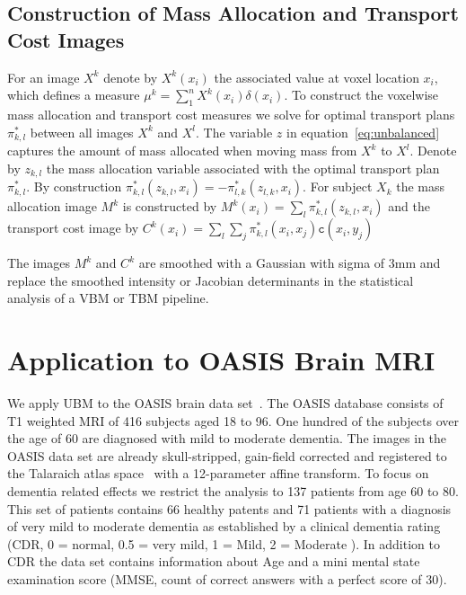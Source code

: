 \documentclass{llncs}
\newcommand{\cost}[0]{\mathtt{c}}
\newcommand{\coupling}[0]{\pi}
\begin{document}
\subsection{Construction of Mass Allocation and Transport Cost Images}
\label{sec:mass}
For an image $X^k$ denote by $X^k(x_i)$ the associated value at voxel location
$x_i$, which defines a measure $\mu^k = \sum_1^n X^k(x_i) \delta(x_i)$.
To construct the voxelwise mass allocation and transport cost measures we solve
for optimal transport plans $\coupling^*_{k,l}$ between all images $X^k$ and $X^l$.  
The variable $z$ in equation~\ref{eq:unbalanced} captures the amount of mass
allocated when moving mass from $X^k$ to $X^l$. Denote by $z_{k, l}$ the mass
allocation variable associated with the optimal transport plan
$\coupling^*_{k,l}$.  By construction $\coupling^*_{k,l}(z_{k,l}, x_i) =
-\coupling^*_{l,k}(z_{l,k}, x_i)$.  For
subject $X_k$ the mass allocation image $M^k$ is constructed by $M^k(x_i) =
\sum_l \coupling^*_{k,l}( z_{k, l}, x_i )$ and the transport cost image by
$C^k(x_i) = \sum_l \sum_j \coupling^*_{k,l}( x_i, x_j ) \cost(x_i, y_j)$

The images $M^k$ and $C^k$ are smoothed with a Gaussian with sigma of 3mm and
replace the smoothed intensity or Jacobian determinants in the statistical
analysis of a VBM or TBM pipeline. 


\section{Application to OASIS Brain MRI}
\label{sec:results}
We apply UBM to the OASIS brain data set~\cite{marcus2010open}. The OASIS
database consists of T1 weighted MRI of 416 subjects aged 18 to 96. One hundred
of the subjects over the age of 60 are diagnosed with mild to moderate
dementia. The images in the OASIS data set are already skull-stripped,
gain-field corrected and registered to the Talaraich atlas
space~\cite{talaraich:book88} with a 12-parameter affine transform.  To focus
on dementia related effects we restrict the analysis to 137 patients from age
60 to 80. This set of patients contains 66 healthy patents and 71 patients with
a diagnosis of very mild to moderate dementia as established by a clinical
dementia rating (CDR, 0 = normal, 0.5 = very mild, 1 = Mild, 2 = Moderate ). In
addition to CDR the data set contains information about Age and a mini mental
state examination score (MMSE, count of correct answers with a perfect score of
30).
\end{document}
